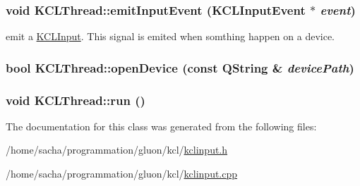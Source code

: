 \hypertarget{class_k_c_l_thread_318807205f19ec5cfbeee2200dbbf995}{
\subsubsection[{emitInputEvent}]{\setlength{\rightskip}{0pt plus 5cm}void KCLThread::emitInputEvent ({\bf KCLInputEvent} $\ast$ {\em event})}}
\label{class_k_c_l_thread_318807205f19ec5cfbeee2200dbbf995}


emit a \hyperlink{class_k_c_l_input}{KCLInput}. This signal is emited when somthing happen on a device. \hypertarget{class_k_c_l_thread_e3c8ade6ac0c14a7a8961e238fb19794}{
\subsubsection[{openDevice}]{\setlength{\rightskip}{0pt plus 5cm}bool KCLThread::openDevice (const QString \& {\em devicePath})}}
\label{class_k_c_l_thread_e3c8ade6ac0c14a7a8961e238fb19794}


\hypertarget{class_k_c_l_thread_12a55f25353d1ba81fc237a1c9dc22b5}{
\subsubsection[{run}]{\setlength{\rightskip}{0pt plus 5cm}void KCLThread::run ()}}
\label{class_k_c_l_thread_12a55f25353d1ba81fc237a1c9dc22b5}




The documentation for this class was generated from the following files:\begin{CompactItemize}
\item 
/home/sacha/programmation/gluon/kcl/\hyperlink{kclinput_8h}{kclinput.h}\item 
/home/sacha/programmation/gluon/kcl/\hyperlink{kclinput_8cpp}{kclinput.cpp}\end{CompactItemize}
